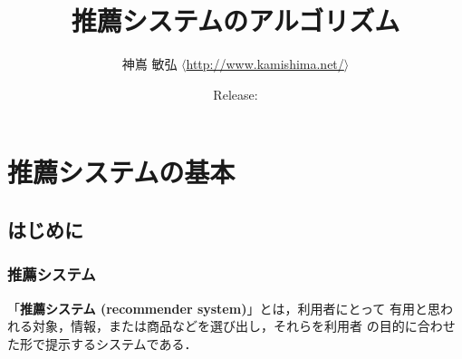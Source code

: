 \documentclass[11pt,a4paper,papersize,oneside]{jsbook}
\title{推薦システムのアルゴリズム}
\author{神嶌 敏弘 $\langle$\url{http://www.kamishima.net/}$\rangle$}
\date{Release: }
\begin{document}
\frontmatter

\maketitle

\onehalfspacing

%


\tableofcontents

\mainmatter

\part{推薦システムの基本}
\chapter{はじめに}
\section{推薦システム}

「\textbf{推薦システム (recommender system)}」とは，利用者にとって
有用と思われる対象，情報，または商品などを選び出し，それらを利用者
の目的に合わせた形で提示するシステムである．



\backmatter
\singlespacing
\pagestyle{empty}





\printindex
\end{document}
